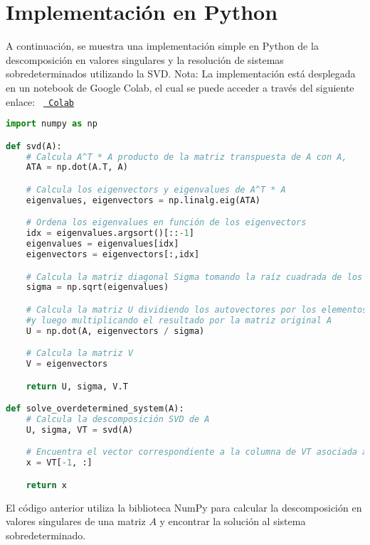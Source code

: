 \documentclass{article}
\begin{document}
    \section{Implementación en Python}
    A continuación, se muestra una implementación simple en Python de la descomposición en valores singulares y la resolución de sistemas sobredeterminados utilizando la SVD.
    Nota: La implementación está desplegada en un notebook de Google Colab, el cual se puede acceder a través del siguiente enlace:
    \texttt{%
        \href{https://colab.research.google.com/drive/1CIy41HI3YFt20mPOnnGMbWKQPAHaVYAX?usp=sharing}{%
            Colab}%
    }



    \begin{lstlisting}[language=Python, caption=Implementación de SVD para resolver sistemas sobredeterminados]
import numpy as np

def svd(A):
    # Calcula A^T * A producto de la matriz transpuesta de A con A,
    ATA = np.dot(A.T, A)

    # Calcula los eigenvectors y eigenvalues de A^T * A
    eigenvalues, eigenvectors = np.linalg.eig(ATA)

    # Ordena los eigenvalues en función de los eigenvectors
    idx = eigenvalues.argsort()[::-1]
    eigenvalues = eigenvalues[idx]
    eigenvectors = eigenvectors[:,idx]

    # Calcula la matriz diagonal Sigma tomando la raíz cuadrada de los autovalores.
    sigma = np.sqrt(eigenvalues)

    # Calcula la matriz U dividiendo los autovectores por los elementos de Sigma
    #y luego multiplicando el resultado por la matriz original A
    U = np.dot(A, eigenvectors / sigma)

    # Calcula la matriz V
    V = eigenvectors

    return U, sigma, V.T

def solve_overdetermined_system(A):
    # Calcula la descomposición SVD de A
    U, sigma, VT = svd(A)

    # Encuentra el vector correspondiente a la columna de VT asociada al menor valor singular
    x = VT[-1, :]

    return x
    \end{lstlisting}

    \noindent
    El código anterior utiliza la biblioteca NumPy para calcular la descomposición en valores singulares de una matriz $A$ y encontrar la solución al sistema sobredeterminado.
\end{document}
